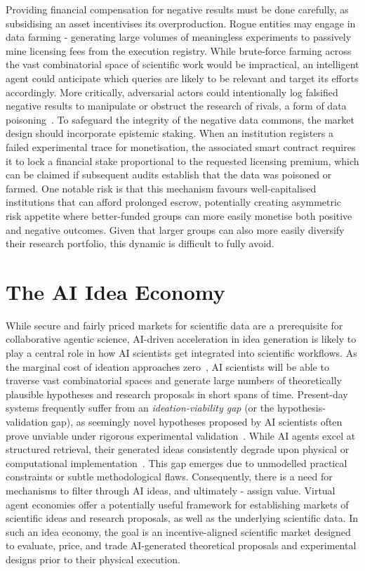 \documentclass[11pt, a4paper, twocolumn, goog]{google}
\begin{document}
Providing financial compensation for negative results must be done carefully, as subsidising an asset incentivises its overproduction. Rogue entities may engage in data farming - generating large volumes of meaningless experiments to passively mine licensing fees from the execution registry. While brute-force farming across the vast combinatorial space of scientific work would be impractical, an intelligent agent could anticipate which queries are likely to be relevant and target its efforts accordingly. More critically, adversarial actors could intentionally log falsified negative results to manipulate or obstruct the research of rivals, a form of data poisoning~\citep{goldblum2021datasetsecuritymachinelearning}. To safeguard the integrity of the negative data commons, the market design should incorporate epistemic staking. When an institution registers a failed experimental trace for monetisation, the associated smart contract requires it to lock a financial stake proportional to the requested licensing premium, which can be claimed if subsequent audits establish that the data was poisoned or farmed. One notable risk is that this mechanism favours well-capitalised institutions that can afford prolonged escrow, potentially creating asymmetric risk appetite where better-funded groups can more easily monetise both positive and negative outcomes. Given that larger groups can also more easily diversify their research portfolio, this dynamic is difficult to fully avoid.


\section{The AI Idea Economy}
\label{sec:ideaeconomy}

While secure and fairly priced markets for scientific data are a prerequisite for collaborative agentic science, AI-driven acceleration in idea generation is likely to play a central role in how AI scientists get integrated into scientific workflows. As the marginal cost of ideation approaches zero~\citep{agrawal2022prediction}, AI scientists will be able to traverse vast combinatorial spaces and generate large numbers of theoretically plausible hypotheses and research proposals in short spans of time. Present-day systems frequently suffer from an \emph{ideation-viability gap} (or the hypothesis-validation gap), as seemingly novel hypotheses proposed by AI scientists often prove unviable under rigorous experimental validation~\citep{si2025ideation}. While AI agents excel at structured retrieval, their generated ideas consistently degrade upon physical or computational implementation~\citep{kong2026aiautoresearchroadmap}. This gap emerges due to unmodelled practical constraints or subtle methodological flaws. Consequently, there is a need for mechanisms to filter through AI ideas, and ultimately - assign value. Virtual agent economies offer a potentially useful framework for establishing markets of scientific ideas and research proposals, as well as the underlying scientific data. In such an idea economy, the goal is an incentive-aligned scientific market designed to evaluate, price, and trade AI-generated theoretical proposals and experimental designs prior to their physical execution.
\end{document}
